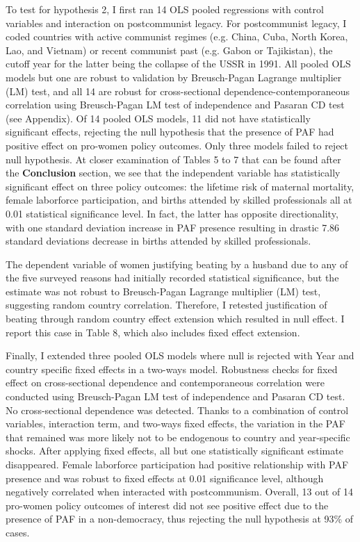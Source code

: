 \documentclass[12pt]{article}
\begin{document}
To test for hypothesis 2, I first ran 14 OLS pooled regressions with control variables and interaction on postcommunist legacy. For postcommunist legacy, I coded countries with active communist regimes (e.g. China, Cuba, North Korea, Lao, and Vietnam) or recent communist past (e.g. Gabon or Tajikistan), the cutoff year for the latter being the collapse of the USSR in 1991. All pooled OLS models but one are robust to validation by Breusch-Pagan Lagrange multiplier (LM) test, and all 14 are robust for cross-sectional dependence-contemporaneous correlation using Breusch-Pagan LM test of independence and Pasaran CD test (see Appendix). Of 14 pooled OLS models, 11 did not have statistically significant effects, rejecting the null hypothesis that the presence of PAF had positive effect on pro-women policy outcomes. Only three models failed to reject null hypothesis. At closer examination of Tables 5 to 7 that can be found after the \textbf{Conclusion} section, we see that the independent variable has statistically significant effect on three policy outcomes: the lifetime risk of maternal mortality, female laborforce participation, and births attended by skilled professionals all at 0.01 statistical significance level. In fact, the latter has opposite directionality, with one standard deviation increase in PAF presence resulting in drastic 7.86 standard deviations decrease in births attended by skilled professionals.  

The dependent variable of women justifying beating by a husband due to any of the five surveyed reasons had initially recorded statistical significance, but the estimate was not robust to Breusch-Pagan Lagrange multiplier (LM) test, suggesting random country correlation. Therefore, I retested justification of beating through random country effect extension which resulted in null effect. I report this case in Table 8, which also includes fixed effect extension. 

Finally, I extended three pooled OLS models where null is rejected with Year and country specific fixed effects in a two-ways model. Robustness checks for fixed effect on cross-sectional dependence and contemporaneous correlation were conducted using Breusch-Pagan LM test of independence and Pasaran CD test. No cross-sectional dependence was detected. Thanks to a combination of control variables, interaction term, and two-ways fixed effects, the variation in the PAF that remained was more likely not to be endogenous to country and year-specific shocks. After applying fixed effects, all but one statistically significant estimate disappeared. Female laborforce participation had positive relationship with PAF presence and was robust to fixed effects at 0.01 significance level, although negatively correlated when interacted with postcommunism. Overall, 13 out of 14 pro-women policy outcomes of interest did not see positive effect due to the presence of PAF in a non-democracy, thus rejecting the null hypothesis at 93\% of cases. 
\end{document}
